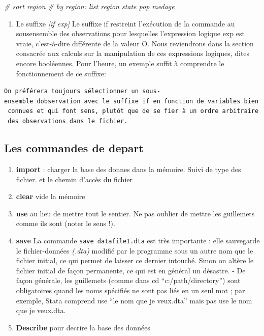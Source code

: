 \documentclass[
]{book}
\newenvironment{Shaded}{\begin{snugshade}}{\end{snugshade}}
\newcommand{\CommentTok}[1]{\textcolor[rgb]{0.56,0.35,0.01}{\textit{#1}}}
\providecommand{\tightlist}{%
  \setlength{\itemsep}{0pt}\setlength{\parskip}{0pt}}
\begin{document}
\begin{Shaded}
\begin{Highlighting}[]
\CommentTok{\# sort region}
\CommentTok{\# by region: list region state pop medage}
\end{Highlighting}
\end{Shaded}

\begin{enumerate}
\def\labelenumi{(\alph{enumi})}
\setcounter{enumi}{1}
\tightlist
\item
  Le suffixe \emph{{[}if exp{]}}
  Le suffixe if restreint l'exécution de la commande au sousensemble
  des observations pour lesquelles l'expression logique
  exp est vraie, c'est-à-dire différente de la valeur O.
  Nous reviendrons dans la section consacrée aux calculs sur la
  manipulation de ces expressions logiques, dites encore
  booléennes. Pour l'heure, un exemple suffit à comprendre le
  fonctionnement de ce suffixe:
\end{enumerate}

\texttt{On\ préférera\ toujours\ sélectionner\ un\ sous-ensemble\ d\textquotesingle{}observation\ avec\ le\ suffixe\ if\ en\ fonction\ de\ variables\ bien\ connues\ et\ qui\ font\ sens,\ plutôt\ que\ de\ se\ fier\ à\ un\ ordre\ arbitraire\ des\ observations\ dans\ le\ fichier.}

\hypertarget{les-commandes-de-depart}{%
\subsection{Les commandes de depart}\label{les-commandes-de-depart}}

\begin{enumerate}
\def\labelenumi{(\arabic{enumi})}
\tightlist
\item
  \textbf{import} : charger la base des donnes dans la mémoire. Suivi de type des fichier. et le chemin d'accès du fichier
\item
  \textbf{clear} vide la mémoire
\item
  \textbf{use} au lieu de mettre tout le sentier. Ne pas oublier de mettre les guillemets comme ils sont (noter le sens !).
\item
  \textbf{save} La commande \texttt{save\ datafile1.dta} est très importante : elle sauvegarde le fichier-données \emph{(.dta)} modifié par le programme sous un autre nom que le fichier initial, ce qui permet de laisser ce dernier intouché. Sinon on altère le fichier initial de façon permanente, ce qui est en général un désastre. - De façon générale, les guillemets (comme dans cd ``c:/path/directory'') sont obligatoires quand les noms spécifiés ne sont pas liés en un seul mot ; par exemple, Stata comprend use ``le nom que je veux.dta'' mais pas use le nom que je veux.dta.
\item
  \textbf{Describe} pour decrire la base des données
\end{enumerate}
\end{document}
